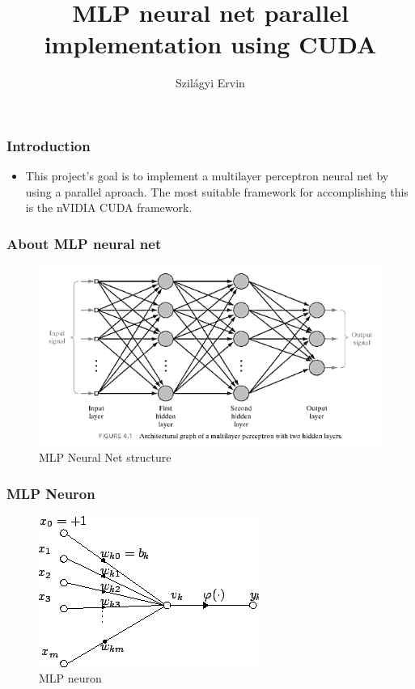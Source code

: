 \documentclass{beamer}
\title{MLP neural net parallel implementation using CUDA}
\author[Szilagyi Ervin]{Szil\'{a}gyi Ervin}
\institute{Sapientia EMTE}
\begin{document}
\begin{frame}
\titlepage
\end{frame}

\begin{frame}
\frametitle{Introduction}
\begin{itemize}
\item This project's goal is to implement a multilayer perceptron neural net by using a parallel aproach. The most suitable framework for accomplishing this is the nVIDIA CUDA framework. 
\end{itemize}
\end{frame} 

\begin{frame}
\frametitle{About MLP neural net}
\begin{figure}
\centering
\includegraphics[scale=0.5]{mlp_structure.png}
\caption{MLP Neural Net structure}
\end{figure} 
\end{frame} 

\begin{frame}
\frametitle{MLP Neuron}
\begin{figure}
\centering
\includegraphics[scale=0.5]{neuron.png}
\caption{MLP neuron}
\end{figure} 
\end{frame}
\end{document}
